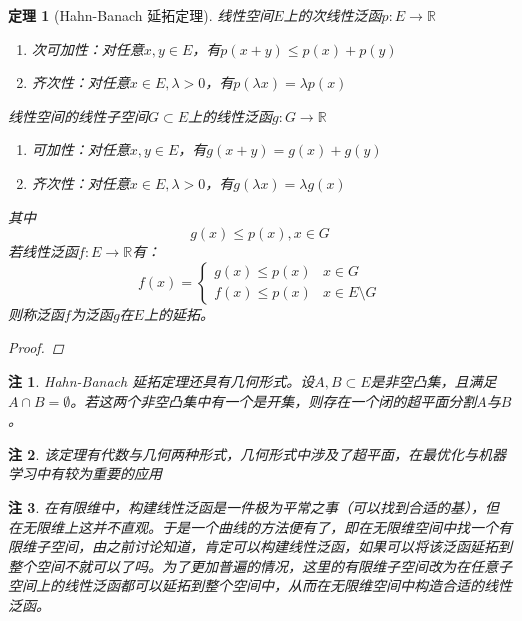 \documentclass{article}                     %
\numberwithin{equation}{section}            %
\numberwithin{figure}{section}              %
\numberwithin{table}{section}               %
\newtheorem{theorem}{\indent 定理}[section] %
\newtheorem{remark}{\indent 注}[section]
\begin{document}
\begin{theorem}[Hahn-Banach 延拓定理]
    线性空间$E$上的次线性泛函$p:E\to \mathbb{R} $
    \begin{enumerate}
        \item 次可加性：对任意$x,y\in E$，有$p(x+y)\le p(x)+p(y)$
        \item 齐次性：对任意$x\in E,\lambda >0$，有$p(\lambda x)=\lambda p(x)$
    \end{enumerate}
    线性空间的线性子空间$G\subset E$上的线性泛函$g:G\to \mathbb{R} $
    \begin{enumerate}
        \item 可加性：对任意$x,y\in E$，有$g(x+y)= g(x)+g(y)$
        \item 齐次性：对任意$x\in E,\lambda >0$，有$g(\lambda x)=\lambda g(x)$
    \end{enumerate}
    其中
    $$g(x)\le p(x),x\in G$$
    若线性泛函$f:E\to \mathbb{R} $有：
    \begin{equation*}
        f(x)=\left\{\begin{matrix}
            g(x)\le p(x)&x\in G\\
            f(x)\le p(x)&x\in E\setminus G
           \end{matrix}\right.
    \end{equation*}
    则称泛函$f$为泛函$g$在$E$上的延拓。
    \begin{proof}
        
    \end{proof}
\end{theorem}
\begin{remark}
    Hahn-Banach 延拓定理还具有几何形式。设$A,B\subset E$是非空凸集，且满足$A\cap B=\emptyset $。若这两个非空凸集中有一个是开集，则存在一个闭的超平面分割$A$与$B$。
\end{remark}
\begin{remark}
    该定理有代数与几何两种形式，几何形式中涉及了超平面，在最优化与机器学习中有较为重要的应用
\end{remark}
\begin{remark}
    在有限维中，构建线性泛函是一件极为平常之事（可以找到合适的基），但在无限维上这并不直观。于是一个曲线的方法便有了，即在无限维空间中找一个有限维子空间，由之前讨论知道，肯定可以构建线性泛函，如果可以将该泛函延拓到整个空间不就可以了吗。为了更加普遍的情况，这里的有限维子空间改为在任意子空间上的线性泛函都可以延拓到整个空间中，从而在无限维空间中构造合适的线性泛函。
\end{remark}
\end{document}
